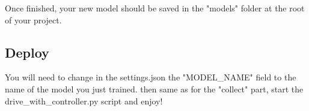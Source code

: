 \documentclass[12pt]{article}
\begin{document}
Once finished, your new model should be saved in the "models" folder at the root of your project.\\

\subsection{Deploy}
You will need to change in the settings.json the "MODEL_NAME" field to the name of the model you just trained. then same as for the "collect" part, start the drive_with_controller.py script and enjoy! \\

\noindent{}\\
\end{document}
